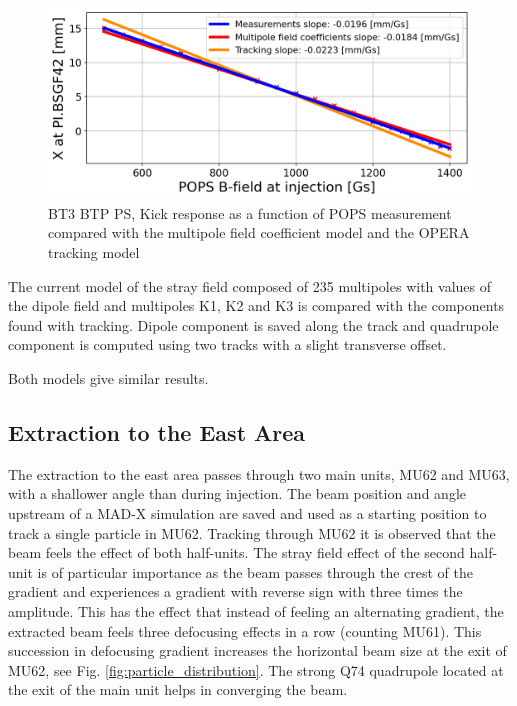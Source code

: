 \documentclass[a4paper,
               biblatex,     %
               keeplastbox,   %
               ]{jacow}
\begin{document}
\begin{figure}[!htb]
   \centering
   \includegraphics*[width=1.0\columnwidth]{transverse_position_vs_POPS}
   \caption{BT3 BTP PS, Kick response as a function of POPS measurement compared with the multipole field coefficient model and the OPERA tracking model}
   \label{fig:injection_btp_transverse_position}
\end{figure}

The current model of the stray field composed of 235 multipoles with values of the dipole field and multipoles K1, K2 and K3 is compared with the components found with tracking. Dipole component is saved along the track and quadrupole component is computed using two tracks with a slight transverse offset.



Both models give similar results.


\subsection{Extraction to the East Area}
The extraction to the east area passes through two main units, MU62 and MU63, with a shallower angle than during injection. The beam position and angle upstream of a MAD-X simulation are saved and used as a starting position to track a single particle in MU62. Tracking through MU62 it is observed that the beam feels the effect of both half-units. The stray field effect of the second half-unit is of particular importance as the beam passes through the crest of the gradient and experiences a gradient with reverse sign with three times the amplitude. This has the effect that instead of feeling an alternating gradient, the extracted beam feels three defocusing effects in a row (counting MU61). This succession in defocusing gradient increases the horizontal beam size at the exit of MU62, see Fig. \ref{fig:particle_distribution}. The strong Q74 quadrupole located at the exit of the main unit helps in converging the beam.
\end{document}
